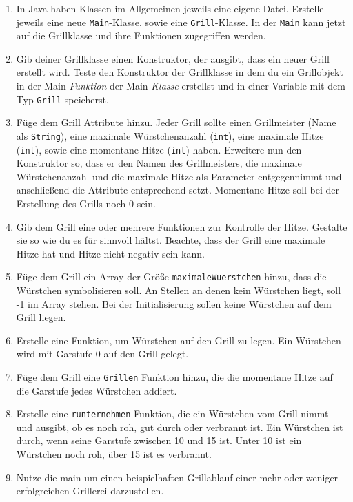 \documentclass{../../sheet}
\begin{document}
\begin{enumerate}
    \item In Java haben Klassen im Allgemeinen jeweils eine eigene Datei. Erstelle jeweils eine neue \texttt{Main}-Klasse, sowie eine \texttt{Grill}-Klasse. In der \texttt{Main} kann jetzt auf die Grillklasse und ihre Funktionen zugegriffen werden.
    \item Gib deiner Grillklasse einen Konstruktor, der ausgibt, dass ein neuer Grill erstellt wird. Teste den Konstruktor der Grillklasse in dem du ein Grillobjekt in der Main-\textit{Funktion} der Main-\textit{Klasse} erstellst und in einer Variable mit dem Typ \texttt{Grill} speicherst.
    \item Füge dem Grill Attribute hinzu. Jeder Grill sollte einen Grillmeister (Name als \texttt{String}), eine maximale Würstchenanzahl (\texttt{int}), eine maximale Hitze (\texttt{int}), sowie eine momentane Hitze (\texttt{int}) haben. Erweitere nun den Konstruktor so, dass er den Namen des Grillmeisters, die maximale Würstchenanzahl und die maximale Hitze als Parameter entgegennimmt und anschließend die Attribute entsprechend setzt. Momentane Hitze soll bei der Erstellung des Grills noch 0 sein.
    \item Gib dem Grill eine oder mehrere Funktionen zur Kontrolle der Hitze. Gestalte sie so wie du es für sinnvoll hältst. Beachte, dass der Grill eine maximale Hitze hat und Hitze nicht negativ sein kann. 
    \item Füge dem Grill ein Array der Größe \texttt{maximaleWuerstchen} hinzu, dass die Würstchen symbolisieren soll. An Stellen an denen kein Würstchen liegt, soll -1 im Array stehen. Bei der Initialisierung sollen keine Würstchen auf dem Grill liegen.
    \item Erstelle eine Funktion, um Würstchen auf den Grill zu legen. Ein Würstchen wird mit Garstufe 0 auf den Grill gelegt. 
    \item Füge dem Grill eine \texttt{Grillen} Funktion hinzu, die die momentane Hitze auf die Garstufe jedes Würstchen addiert.
    \item Erstelle eine \texttt{runternehmen}-Funktion, die ein Würstchen vom Grill nimmt und ausgibt, ob es noch roh, gut durch oder verbrannt ist. Ein Würstchen ist durch, wenn seine Garstufe zwischen 10 und 15 ist. Unter 10 ist ein Würstchen noch roh, über 15 ist es verbrannt.
    \item Nutze die main um einen beispielhaften Grillablauf einer mehr oder weniger erfolgreichen Grillerei darzustellen.
\end{enumerate}
\end{document}
